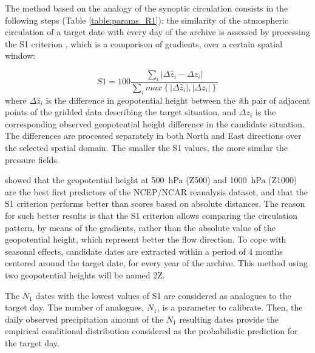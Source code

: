 \documentclass[review]{elsarticle}
\begin{document}
The method based on the analogy of the synoptic circulation consists in the following steps (Table \ref{table:params_R1}): the similarity of the atmospheric circulation of a target date with every day of the archive is assessed by processing the S1 criterion \citep[Eq.\ \ref{eq:S1}, ][]{Teweles1954, Drosdowsky2003}, which is a comparison of gradients, over a certain spatial window:

\begin{equation}
\label{eq:S1}
S1=100 \frac {\displaystyle \sum_{i} \vert \Delta\hat{z}_{i} - \Delta z_{i} \vert}
{\displaystyle \sum_{i} max\left\lbrace \vert \Delta\hat{z}_{i} \vert , \vert \Delta z_{i} \vert \right\rbrace }
\end{equation}
where $\Delta \hat{z}_{i}$ is the difference in geopotential height between the \textit{i}th pair of adjacent points of the gridded data describing the target situation, and $\Delta z_{i}$ is the corresponding observed geopotential height difference in the candidate situation. The differences are processed separately in both North and East directions over the selected spatial domain. The smaller the S1 values, the more similar the pressure fields.

\citet{Bontron2005} showed that the geopotential height at 500~hPa (Z500) and 1000~hPa (Z1000) are the best first predictors of the NCEP/NCAR reanalysis dataset, and that the S1 criterion performs better than scores based on absolute distances. The reason for such better results is that the S1 criterion allows comparing the circulation pattern, by means of the gradients, rather than the absolute value of the geopotential height, which represent better the flow direction. To cope with seasonal effects, candidate dates are extracted within a period of 4 months centered around the target date, for every year of the archive. This method using two geopotential heights will be named 2Z.

The $N_{1}$ dates with the lowest values of S1 are considered as analogues to the target day. The number of analogues, $N_{1}$, is a parameter to calibrate. Then, the daily observed precipitation amount of the $N_{1}$ resulting dates provide the empirical conditional distribution considered as the probabilistic prediction for the target day.
\end{document}
